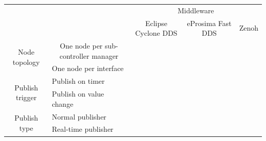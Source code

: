 \begin{table}[]
\begin{tabular}{cl|lll}
\multicolumn{1}{l}{}                                  &                                                          & \multicolumn{3}{c}{Middleware}                                                                                \\ \cline{3-5} 
\multicolumn{1}{l}{}                                  &                                                          & \multicolumn{1}{c|}{Eclipse Cyclone DDS} & \multicolumn{1}{c|}{eProsima Fast DDS} & \multicolumn{1}{c}{Zenoh} \\ \hline
\multicolumn{1}{c|}{\multirow{2}{*}{Node topology}}   & \multicolumn{1}{c|}{One node per sub-controller manager} & \multicolumn{1}{l|}{}                    & \multicolumn{1}{l|}{}                  & \multicolumn{1}{l|}{}     \\ \cline{2-5} 
\multicolumn{1}{c|}{}                                 & One node per interface                                   & \multicolumn{1}{l|}{}                    & \multicolumn{1}{l|}{}                  & \multicolumn{1}{l|}{}     \\ \hline
\multicolumn{1}{c|}{\multirow{2}{*}{Publish trigger}} & Publish on timer                                         & \multicolumn{1}{l|}{}                    & \multicolumn{1}{l|}{}                  & \multicolumn{1}{l|}{}     \\ \cline{2-5} 
\multicolumn{1}{c|}{}                                 & Publish on value change                                  & \multicolumn{1}{l|}{}                    & \multicolumn{1}{l|}{}                  & \multicolumn{1}{l|}{}     \\ \hline
\multicolumn{1}{c|}{\multirow{2}{*}{Publish type}} & Normal publisher                                         & \multicolumn{1}{l|}{}                    & \multicolumn{1}{l|}{}                  & \multicolumn{1}{l|}{}     \\ \cline{2-5} 
\multicolumn{1}{c|}{}                                 & Real-time publisher                                      & \multicolumn{1}{l|}{}                    & \multicolumn{1}{l|}{}                  & \multicolumn{1}{l|}{}     \\ \hline
\end{tabular}
\end{table}

